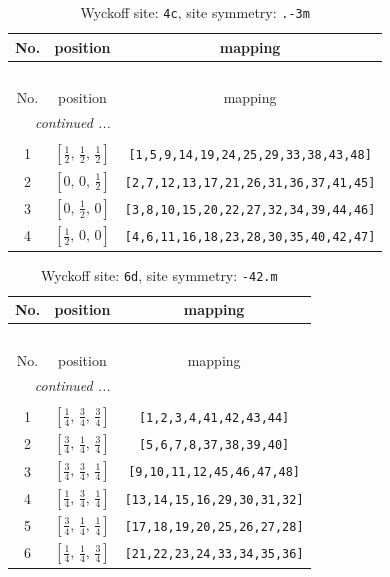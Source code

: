 \documentclass[fleqn,8pt]{jsarticle}
\begin{document}
\renewcommand{\arraystretch}{1.2}
\begin{longtable}{ccc}
\caption{Wyckoff site: {\tt 4c}, site symmetry: {\tt .-3m}}
 \\
 \hline \hline
No. & position & mapping \\ \hline \endfirsthead

\multicolumn{2}{l}{\tablename\ \thetable{}} \\
 \hline \hline
No. & position & mapping \\ \hline \endhead

 \hline \hline
\multicolumn{2}{r}{\footnotesize\it continued ...} \\ \endfoot

 \hline \hline
\multicolumn{2}{r}{} \\ \endlastfoot

1 & $\left[ \frac{1}{2},\, \frac{1}{2},\, \frac{1}{2} \right]$ & {\tt [1,5,9,14,19,24,25,29,33,38,43,48]} \\ \hline
2 & $\left[ 0,\, 0,\, \frac{1}{2} \right]$ & {\tt [2,7,12,13,17,21,26,31,36,37,41,45]} \\ \hline
3 & $\left[ 0,\, \frac{1}{2},\, 0 \right]$ & {\tt [3,8,10,15,20,22,27,32,34,39,44,46]} \\ \hline
4 & $\left[ \frac{1}{2},\, 0,\, 0 \right]$ & {\tt [4,6,11,16,18,23,28,30,35,40,42,47]} \\
\end{longtable}
\renewcommand{\arraystretch}{1.2}
\begin{longtable}{ccc}
\caption{Wyckoff site: {\tt 6d}, site symmetry: {\tt -42.m}}
 \\
 \hline \hline
No. & position & mapping \\ \hline \endfirsthead

\multicolumn{2}{l}{\tablename\ \thetable{}} \\
 \hline \hline
No. & position & mapping \\ \hline \endhead

 \hline \hline
\multicolumn{2}{r}{\footnotesize\it continued ...} \\ \endfoot

 \hline \hline
\multicolumn{2}{r}{} \\ \endlastfoot

1 & $\left[ \frac{1}{4},\, \frac{3}{4},\, \frac{3}{4} \right]$ & {\tt [1,2,3,4,41,42,43,44]} \\ \hline
2 & $\left[ \frac{3}{4},\, \frac{1}{4},\, \frac{3}{4} \right]$ & {\tt [5,6,7,8,37,38,39,40]} \\ \hline
3 & $\left[ \frac{3}{4},\, \frac{3}{4},\, \frac{1}{4} \right]$ & {\tt [9,10,11,12,45,46,47,48]} \\ \hline
4 & $\left[ \frac{1}{4},\, \frac{3}{4},\, \frac{1}{4} \right]$ & {\tt [13,14,15,16,29,30,31,32]} \\ \hline
5 & $\left[ \frac{3}{4},\, \frac{1}{4},\, \frac{1}{4} \right]$ & {\tt [17,18,19,20,25,26,27,28]} \\ \hline
6 & $\left[ \frac{1}{4},\, \frac{1}{4},\, \frac{3}{4} \right]$ & {\tt [21,22,23,24,33,34,35,36]} \\
\end{longtable}
\end{document}
